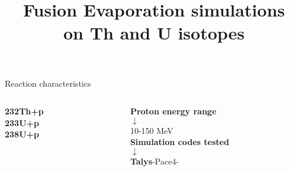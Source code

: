 \documentclass[10pt]{beamer}
\title{\normalsize Fusion Evaporation simulations\\ on Th and U isotopes}
\institute{}
\author{}
\date{}
\begin{document}
\frame{\titlepage}

\begin{frame}{Reaction characteristics}
\begin{columns}
	\begin{column}{0.5\textwidth}
		\centering
		\textbf{\color{red}232Th+p}	\\
		\vspace{0.1\textheight}
		\textbf{\color{red}233U+p}\\
		\vspace{0.1\textheight}
		\textbf{\color{red}238U+p}\\
	\end{column}
	\begin{column}{0.5\textwidth}
		\centering
		\textbf{Proton energy range}\\ $\downarrow$\\ 10-150 MeV\\
		\vspace{0.1\textheight}
	 	\textbf{Simulation codes tested}\\ $\downarrow$\\ \textbf{Talys}-Pace4-\color{red}{Fluka}
	\end{column}
\end{columns}
\end{frame}
\end{document}
